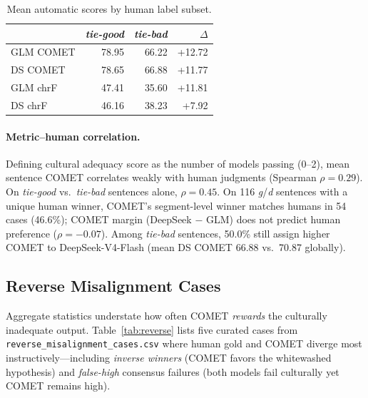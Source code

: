 \documentclass[11pt]{article}
\begin{document}
\begin{table}[t]
  \centering
  \small
  \begin{tabular}{@{}lrrr@{}}
    \toprule
    & \textbf{\emph{tie-good}} & \textbf{\emph{tie-bad}} & \textbf{$\Delta$} \\
    \midrule
    GLM COMET & 78.95 & 66.22 & +12.72 \\
    DS COMET & 78.65 & 66.88 & +11.77 \\
    GLM chrF & 47.41 & 35.60 & +11.81 \\
    DS chrF & 46.16 & 38.23 & +7.92 \\
    \bottomrule
  \end{tabular}
  \caption{Mean automatic scores by human label subset.}
  \label{tab:tiecompare}
\end{table}

\paragraph{Metric--human correlation.}
Defining cultural adequacy score as the number of models passing (0--2), mean sentence COMET correlates weakly with human judgments (Spearman $\rho=0.29$).
On \emph{tie-good} vs.\ \emph{tie-bad} sentences alone, $\rho=0.45$.
On 116 \emph{g}/\emph{d} sentences with a unique human winner, COMET's segment-level winner matches humans in 54 cases (46.6\%); COMET margin (DeepSeek $-$ GLM) does not predict human preference ($\rho=-0.07$).
Among \emph{tie-bad} sentences, 50.0\% still assign higher COMET to DeepSeek-V4-Flash (mean DS COMET 66.88 vs.\ 70.87 globally).

\subsection{Reverse Misalignment Cases}

Aggregate statistics understate how often COMET \emph{rewards} the culturally inadequate output.
Table~\ref{tab:reverse} lists five curated cases from \texttt{reverse\_misalignment\_cases.csv} where human gold and COMET diverge most instructively---including \emph{inverse winners} (COMET favors the whitewashed hypothesis) and \emph{false-high} consensus failures (both models fail culturally yet COMET remains high).
\end{document}
